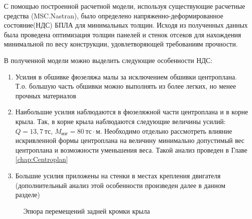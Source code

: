 
С помощью построенной расчетной модели, используя существующие расчетные средства (MSC.Nastran), было определено напряженно-деформированное состояние(НДС) БПЛА для минимальных толщин. Исходя из полученных данных была проведена оптимизация толщин панелей и стенок отсеков для нахождения минимальной по весу конструкции, удовлетворяющей требованиям прочности.

В полученной модели можно выделить следующие особенности НДС:

\begin{enumerate}
\item Усилия в обшивке фюзеляжа малы за исключением обшивки центроплана. Т.о. большую часть обшивки можно выполнять из более легких, но менее прочных материалов
\item Наибольшие усилия наблюдаются в фюзеляжной части центроплана и в корне крыла. Так, в корне крыла наблюдаются следующие величины усилий: $Q = 13,7~\text{тс}$, $M_\text{изг} = 80~\text{тс}\cdot\text{м}$. Необходимо отдельно рассмотреть влияние искривленной формы центроплана на величину минимально допустимый вес центроплана и возможности уменьшения веса. Такой анализ проведен в Главе \ref{chap:Centroplan}
\item Большие усилия приложены на стенки в местах крепления двигателя (дополнительный анализ этой особенности произведен далее в данном разделе)
\end{enumerate}  


%



\begin{figure}[H]
\centering
\def\svgwidth{0.9\textwidth}

\caption{Эпюра перемещений задней кромки крыла}
\label{fig:WingDeformation}
\end{figure}


%
